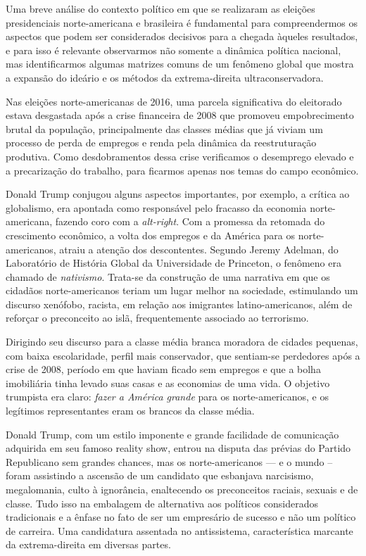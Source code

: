 Uma breve análise do contexto político em que se realizaram as eleições
presidenciais norte-americana e brasileira é fundamental para compreendermos
os aspectos que podem ser considerados decisivos para a chegada àqueles
resultados, e para isso é relevante observarmos não somente a dinâmica
política nacional, mas identificarmos algumas matrizes comuns de um
fenômeno global que mostra a expansão do ideário e os métodos da extrema-direita ultraconservadora.

Nas eleições norte-americanas de 2016, uma parcela significativa do eleitorado
estava desgastada após a crise financeira de 2008 que promoveu
empobrecimento brutal da população, principalmente das classes médias
que já viviam um processo de perda de empregos e renda pela dinâmica da
reestruturação produtiva. Como desdobramentos dessa crise verificamos o
desemprego elevado e a precarização do trabalho, para ficarmos apenas nos
temas do campo econômico.

Donald Trump conjugou alguns aspectos importantes, por exemplo, a
crítica ao globalismo, era apontada como responsável pelo fracasso da
economia norte-americana, fazendo coro com a \textit{alt-right}. Com a promessa da
retomada do crescimento econômico, a volta dos empregos e da América
para os norte-americanos, atraiu a atenção dos descontentes. Segundo Jeremy
Adelman, do Laboratório de História Global da Universidade de Princeton,
o fenômeno era chamado de \textit{nativismo}. Trata-se da construção de uma
narrativa em que os cidadãos norte-americanos teriam um lugar melhor na
sociedade, estimulando um discurso xenófobo, racista, em relação aos
imigrantes latino-americanos, além de reforçar o preconceito ao islã,
frequentemente associado ao terrorismo.

Dirigindo seu discurso para a classe média branca moradora de cidades
pequenas, com baixa escolaridade, perfil mais conservador, que sentiam-se
perdedores após a crise de 2008, período em que haviam ficado sem
empregos e que a bolha imobiliária tinha levado suas casas e as
economias de uma vida. O objetivo trumpista era claro: \textit{fazer a América
grande} para os norte-americanos, e os legítimos representantes eram os brancos
da classe média.

Donald Trump, com um estilo imponente e grande facilidade de comunicação
adquirida em seu famoso reality show, entrou na disputa das prévias do
Partido Republicano sem grandes chances, mas os norte-americanos --- e o mundo
-- foram assistindo a ascensão de um candidato que esbanjava narcisismo,
megalomania, culto à ignorância, enaltecendo os preconceitos raciais,
sexuais e de classe. Tudo isso na embalagem de alternativa aos políticos
considerados tradicionais e a ênfase no fato de ser um empresário de
sucesso e não um político de carreira. Uma candidatura assentada no
antissistema, característica marcante da extrema-direita em diversas
partes.


